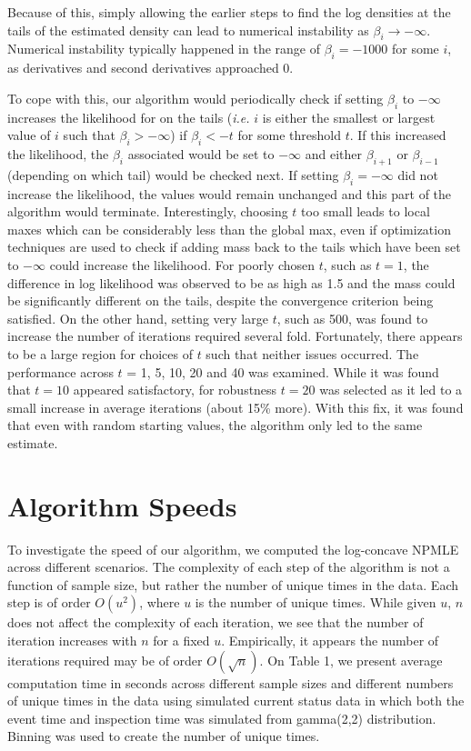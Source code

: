 \documentclass[10pt]{article}
\begin{document}
	Because of this, simply allowing the earlier steps to find the log densities	 at the tails of the estimated density can lead to numerical instability as $\beta_i \rightarrow -\infty$. Numerical instability typically happened in the range of $\beta_i = -1000$ for some $i$, as derivatives and second derivatives approached 0.%
	
	To cope with this, our algorithm would periodically check if setting $\beta_i$ to $-\infty$ increases the likelihood for on the tails (\emph{i.e.} $i$ is either the smallest or largest value of $i$ such that $\beta_i > -\infty$) if $\beta_i < -t$ for some threshold $t$. If this increased the likelihood, the $\beta_i$ associated would be set to $-\infty$ and either $\beta_{i+1}$ or $\beta_{i-1}$ (depending on which tail) would be checked next. If setting $\beta_i = -\infty$ did not increase the likelihood, the values would remain unchanged and this part of the algorithm would terminate. Interestingly, choosing $t$ too small leads to local maxes which can be considerably less than the global max, even if optimization techniques are used to check if adding mass back to the tails which have been set to $-\infty$ could increase the likelihood. For poorly chosen $t$, such as $t = 1$, the difference in log likelihood was observed to be as high as 1.5 and the mass could be significantly different on the tails, despite the convergence criterion being satisfied. On the other hand, setting very large $t$, such as 500, was found to increase the number of iterations required several fold. Fortunately, there appears to be a large region for choices of $t$ such that neither issues occurred. The performance across $t$ = 1, 5, 10, 20 and 40 was examined. While it was found that $t = 10$ appeared satisfactory, for robustness $t = 20$ was selected as it led to a small increase in average iterations (about 15\% more). With this fix, it was found that even with random starting values, the algorithm only led to the same estimate. 
		
		{\section{Algorithm Speeds} } 
	
	To investigate the speed of our algorithm, we computed the log-concave NPMLE across different scenarios. The complexity of each step of the algorithm is not a function of sample size, but rather the number of unique times in the data. Each step is of order $O(u^2)$, where $u$ is the number of unique times. While given $u$, $n$ does not affect the complexity of each iteration,  we see that the number of iteration increases with $n$ for a fixed $u$. Empirically, it appears the number of iterations required may be of order $O(\sqrt{n})$. On Table 1, we present average computation time in seconds across different sample sizes and different numbers of unique times in the data using simulated current status data in which both the event time and inspection time was simulated from gamma(2,2) distribution. Binning was used to create the number of unique times. 
	
\end{document}

